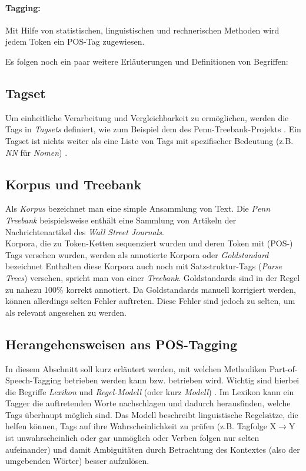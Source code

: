\paragraph{Tagging:} Mit Hilfe von statistischen, linguistischen und rechnerischen Methoden wird jedem Token ein POS-Tag zugewiesen. 

Es folgen noch ein paar weitere Erläuterungen und Definitionen von Begriffen:

\subsection{Tagset}
\label{sec:related:pos:tagset}

Um einheitliche Verarbeitung und Vergleichbarkeit zu ermöglichen, werden die Tags in \textit{Tagsets} definiert, wie zum Beispiel dem des Penn-Treebank-Projekts \linebreak \cite{Web:PennBank} \cite{Paper:PennBank}. Ein Tagset ist nichts weiter als eine Liste von Tags mit spezifischer Bedeutung (z.B. \textit{NN} für \textit{Nomen}) \cite{halteren}.

\subsection{Korpus und Treebank}
\label{sec:related:pos:corpus}

Als \textit{Korpus} bezeichnet man eine simple Ansammlung von Text. Die \textit{Penn Treebank} \cite{Paper:PennBank} beispielsweise enthält eine Sammlung von Artikeln der Nachrichtenartikel des \textit{Wall Street Journals}.
\\
Korpora, die zu Token-Ketten sequenziert wurden und deren Token mit (POS-) Tags versehen wurden, werden als annotierte Korpora oder \textit{Goldstandard} bezeichnet \cite{halteren} Enthalten diese Korpora auch noch mit Satzstruktur-Tags (\textit{Parse Trees}) versehen, spricht man von einer \textit{Treebank}. Goldstandards sind in der Regel zu nahezu 100\% korrekt annotiert. Da Goldstandards manuell korrigiert werden, können allerdings selten Fehler auftreten. Diese Fehler sind jedoch zu selten, um als relevant angesehen zu werden.

\subsection{Herangehensweisen ans POS-Tagging}
In diesem Abschnitt soll kurz erläutert werden, mit welchen Methodiken Part-of-Speech-Tagging betrieben werden kann bzw. betrieben wird. Wichtig sind hierbei die Begriffe \textit{Lexikon} und \textit{Regel-Modell} (oder kurz \textit{Modell}) \cite{Smith} \cite{Eynde}. Im Lexikon kann ein Tagger die auftretenden Worte nachschlagen und dadurch herausfinden, welche Tags überhaupt möglich sind. Das Modell beschreibt linguistische Regelsätze, die helfen können, Tags auf ihre Wahrscheinlichkeit zu prüfen (z.B. \glqq Tagfolge X$\rightarrow$Y ist unwahrscheinlich oder gar unmöglich\grqq{} oder \glqq Verben folgen nur selten aufeinander\grqq{}) und damit Ambiguitäten durch Betrachtung des Kontextes (also der umgebenden Wörter) besser aufzulösen.

